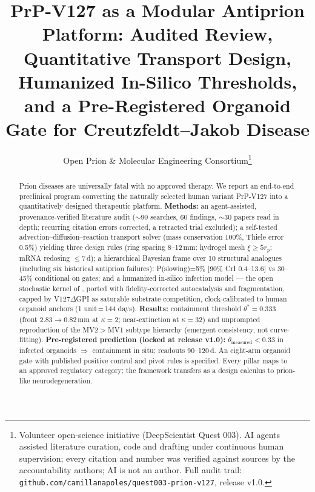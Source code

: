 \documentclass[10pt,twocolumn]{article}
\title{\bfseries PrP-V127 as a Modular Antiprion Platform: Audited Review, Quantitative Transport Design, Humanized In-Silico Thresholds, and a Pre-Registered Organoid Gate for Creutzfeldt--Jakob Disease}
\author{\normalsize Open Prion \& Molecular Engineering Consortium\thanks{Volunteer open-science initiative (DeepScientist Quest 003). AI agents assisted literature curation, code and drafting under continuous human supervision; every citation and number was verified against sources by the accountability authors; AI is not an author. Full audit trail: \texttt{github.com/camillanapoles/quest003-prion-v127}, release v1.0.}}
\date{}
\begin{document}
\maketitle

\begin{abstract}\small
Prion diseases are universally fatal with no approved therapy. We report an end-to-end preclinical program converting the naturally selected human variant PrP-V127 into a quantitatively designed therapeutic platform. \textbf{Methods:} an agent-assisted, provenance-verified literature audit ($\sim$90 searches, 60 findings, $\sim$30 papers read in depth; recurring citation errors corrected, a retracted trial excluded); a self-tested advection--diffusion--reaction transport solver (mass conservation 100\%, Thiele error 0.5\%) yielding three design rules (ring spacing 8--12\,mm; hydrogel mesh $\xi\ge5r_p$; mRNA redosing $\le$7\,d); a hierarchical Bayesian frame over 10 structural analogues (including six historical antiprion failures): P(slowing)=5\% [90\% CrI 0.4--13.6] vs 30--45\% conditional on gates; and a humanized in-silico infection model --- the open stochastic kernel of \citet{fornara2024}, ported with fidelity-corrected autocatalysis and fragmentation, capped by V127$\Delta$GPI as saturable substrate competition, clock-calibrated to human organoid anchors \citep{groveman2019} (1 unit\,=\,144 days). \textbf{Results:} containment threshold $\theta^{*}=0.333$ (front 2.83$\to$0.82\,mm at $\kappa=2$; near-extinction at $\kappa=32$) and unprompted reproduction of the MV2$>$MV1 subtype hierarchy (emergent consistency, not curve-fitting). \textbf{Pre-registered prediction (locked at release v1.0):} $\theta_{\text{measured}}<0.33$ in infected organoids $\Rightarrow$ containment in situ; readouts 90--120\,d. An eight-arm organoid gate with published positive control and pivot rules is specified. Every pillar maps to an approved regulatory category; the framework transfers as a design calculus to prion-like neurodegeneration.
\end{abstract}
\end{document}
